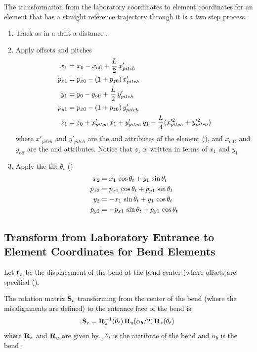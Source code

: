 The transformation from the laboratory coordinates to element
coordinates for an element that has a straight reference trajectory
through it is a two step process.
\begin{enumerate}
\setlength{\itemsep}{0pt}
\item
Track as in a drift a distance .
\item
Apply offsets and pitches
\vspace{-1ex}
\begin{align}
  x_1    &= x_0 - x_{\text{off}} + \frac{L}{2} \, x'_{pitch} \nonumber \\
  p_{x1} &= p_{x0} - (1 + p_{z0}) \, x'_{pitch} \nonumber \\
  y_1    &= y_0 - y_{\text{off}} + \frac{L}{2} \, y'_{pitch} \\
  p_{y1} &= p_{x0} - (1 + p_{z0}) \, y'_{pitch} \nonumber \\
  z_1    &= z_0 + x'_{pitch} \, x_1 + y'_{pitch} \, y_1 - 
    \frac{L}{4} (x^{\prime2}_{pitch} + y^{\prime2}_{pitch}) \nonumber
\end{align}
where $x'_{pitch}$ and $y'_{pitch}$ are the  and
 attributes of the element (), and
$x_{\text{off}}$, and $y_{\text{off}}$ are the  and
 attributes.
Notice that $z_1$ is written in terms of $x_1$ and $y_1$
\item
Apply the tilt $\theta_t$ ()
\vspace{-1ex}
\begin{align}
  x_2    &=  x_1    \, \cos\theta_t + y_1    \, \sin\theta_t \nonumber \\
  p_{x2} &=  p_{x1} \, \cos\theta_t + p_{y1} \, \sin\theta_t \nonumber \\
  y_2    &= -x_1    \, \sin\theta_t + y_1    \, \cos\theta_t \\
  p_{y2} &= -p_{x1} \, \sin\theta_t + p_{y1} \, \cos\theta_t \nonumber
\end{align}
\end{enumerate}

\subsection{Transform from Laboratory Entrance to Element Coordinates for Bend Elements}

Let ${\bf r}_c$ be the displacement of the bend at the bend center (where
offsets are specified ().

The rotation matrix ${\bf S}_c$ transforming
from the center of the bend (where the misalignments are defined) to the
entrance face of the bend is
\begin{align}
  {\bf S}_c &= {\bf R}_{z}^{-1} (\theta_t) \, {\bf R}_{y} (\alpha_b/2) \, {\bf R}_{z} (\theta_t) \\
\end{align}
where ${\bf R}_{z}$ and ${\bf R}_{y}$ are given by ,
$\theta_t$ is the  attribute of the bend and $\alpha_b$
is the bend .

